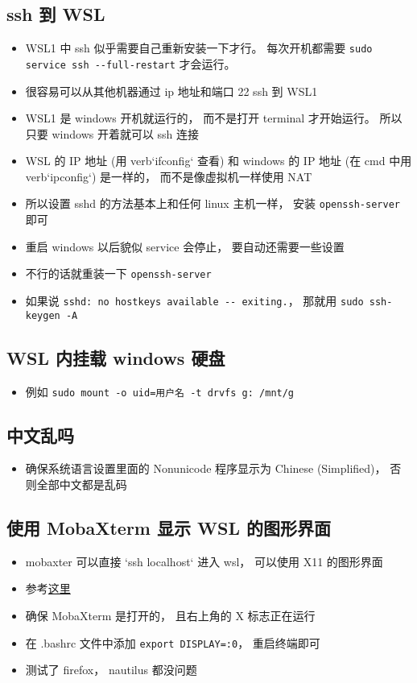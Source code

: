\subsection{ssh 到 WSL}
\begin{itemize}
\item WSL1 中 ssh 似乎需要自己重新安装一下才行。 每次开机都需要 \verb|sudo service ssh --full-restart| 才会运行。
\item 很容易可以从其他机器通过 ip 地址和端口 22 ssh 到 WSL1
\item WSL1 是 windows 开机就运行的， 而不是打开 terminal 才开始运行。 所以只要 windows 开着就可以 ssh 连接
\item WSL 的 IP 地址 (用 verb`ifconfig` 查看) 和 windows 的 IP 地址 (在 cmd 中用 verb`ipconfig`) 是一样的， 而不是像虚拟机一样使用 NAT
\item 所以设置 sshd 的方法基本上和任何 linux 主机一样， 安装 \verb`openssh-server` 即可
\item 重启 windows 以后貌似 service 会停止， 要自动还需要一些设置
\item 不行的话就重装一下 \verb|openssh-server|
\item 如果说 \verb|sshd: no hostkeys available -- exiting.|， 那就用 \verb|sudo ssh-keygen -A|
\end{itemize}

\subsection{WSL 内挂载 windows 硬盘}
\begin{itemize}
\item 例如 \verb`sudo mount -o uid=用户名 -t drvfs g: /mnt/g`
\end{itemize}

\subsection{中文乱吗}
\begin{itemize}
\item 确保系统语言设置里面的 Nonunicode 程序显示为 Chinese (Simplified)， 否则全部中文都是乱码
\end{itemize}

\subsection{使用 MobaXterm 显示 WSL 的图形界面}
\begin{itemize}
\item mobaxter 可以直接 `ssh localhost` 进入 wsl， 可以使用 X11 的图形界面
\item 参考\href{https://nickjanetakis.com/blog/using-wsl-and-mobaxterm-to-create-a-linux-dev-environment-on-windows}{这里}
\item 确保 MobaXterm 是打开的， 且右上角的 X 标志正在运行
\item 在 .bashrc 文件中添加 \verb`export DISPLAY=:0`， 重启终端即可
\item 测试了 firefox， nautilus 都没问题
\end{itemize}

